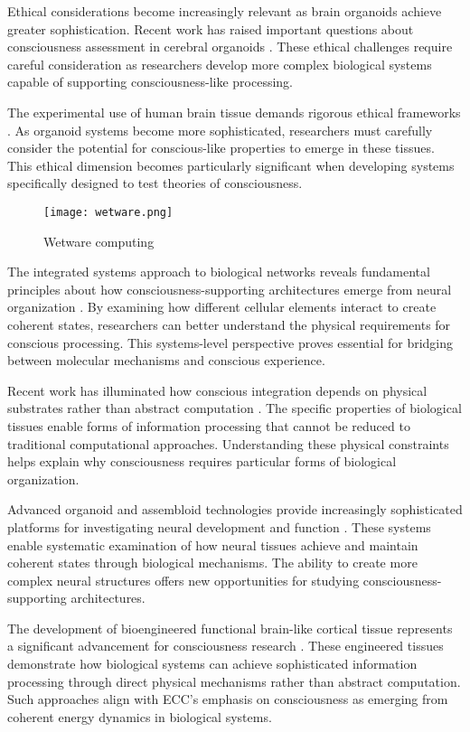 Ethical considerations become increasingly relevant as brain organoids achieve greater sophistication. Recent work has raised important questions about consciousness assessment in cerebral organoids \cite{Lavazza2018}. These ethical challenges require careful consideration as researchers develop more complex biological systems capable of supporting consciousness-like processing.

The experimental use of human brain tissue demands rigorous ethical frameworks \cite{Farahany2018}. As organoid systems become more sophisticated, researchers must carefully consider the potential for conscious-like properties to emerge in these tissues. This ethical dimension becomes particularly significant when developing systems specifically designed to test theories of consciousness.

\begin{figure}[h]
    \centering
    \texttt{[image: wetware.png]}

    \caption{Wetware computing}
\end{figure}

The integrated systems approach to biological networks reveals fundamental principles about how consciousness-supporting architectures emerge from neural organization \cite{Zhang2016}. By examining how different cellular elements interact to create coherent states, researchers can better understand the physical requirements for conscious processing. This systems-level perspective proves essential for bridging between molecular mechanisms and conscious experience.

Recent work has illuminated how conscious integration depends on physical substrates rather than abstract computation \cite{Krishnan2019}. The specific properties of biological tissues enable forms of information processing that cannot be reduced to traditional computational approaches. Understanding these physical constraints helps explain why consciousness requires particular forms of biological organization.

Advanced organoid and assembloid technologies provide increasingly sophisticated platforms for investigating neural development and function \cite{Saha2020}. These systems enable systematic examination of how neural tissues achieve and maintain coherent states through biological mechanisms. The ability to create more complex neural structures offers new opportunities for studying consciousness-supporting architectures.

The development of bioengineered functional brain-like cortical tissue represents a significant advancement for consciousness research \cite{TangSchomer2014}. These engineered tissues demonstrate how biological systems can achieve sophisticated information processing through direct physical mechanisms rather than abstract computation. Such approaches align with ECC's emphasis on consciousness as emerging from coherent energy dynamics in biological systems.


